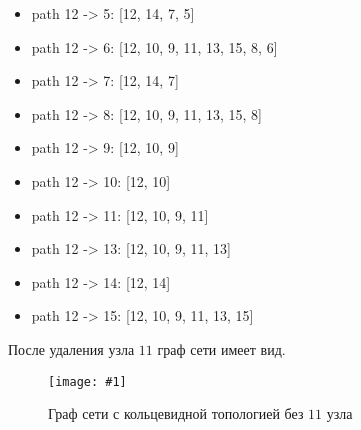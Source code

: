 \documentclass[a4paper,12pt]{article}
\newcommand{\plot}[3]{
    \begin{figure}[H]
        \begin{center}
            \texttt{[image: \#1]}
            \caption{#2}
            \label{#3}
        \end{center}
    \end{figure}
}
\begin{document}
\begin{itemize}
\begin{itemize}
            \item path 12 -> 5: [12, 14, 7, 5]
            \item path 12 -> 6: [12, 10, 9, 11, 13, 15, 8, 6]
            \item path 12 -> 7: [12, 14, 7]
            \item path 12 -> 8: [12, 10, 9, 11, 13, 15, 8]
            \item path 12 -> 9: [12, 10, 9]
            \item path 12 -> 10: [12, 10]
            \item path 12 -> 11: [12, 10, 9, 11]
            \item path 12 -> 13: [12, 10, 9, 11, 13]
            \item path 12 -> 14: [12, 14]
            \item path 12 -> 15: [12, 10, 9, 11, 13, 15]
        \end{itemize}
    \end{itemize}

    После удаления узла $ 11 $ граф сети имеет вид.
    \plot{rm_ring}{Граф сети с кольцевидной топологией без $ 11 $ узла}{p:rmRing}
\end{document}
